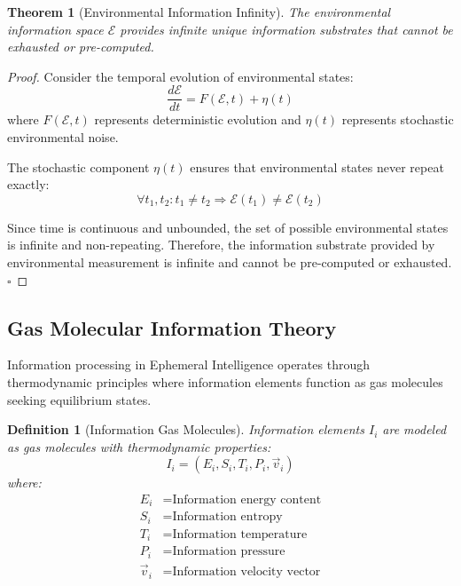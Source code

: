 \documentclass[12pt,a4paper]{article}
\newtheorem{theorem}{Theorem}
\newtheorem{definition}{Definition}
\begin{document}
\begin{theorem}[Environmental Information Infinity]
The environmental information space $\mathcal{E}$ provides infinite unique information substrates that cannot be exhausted or pre-computed.
\end{theorem}

\begin{proof}
Consider the temporal evolution of environmental states:
\begin{equation}
\frac{d\mathcal{E}}{dt} = F(\mathcal{E}, t) + \eta(t)
\end{equation}
where $F(\mathcal{E}, t)$ represents deterministic evolution and $\eta(t)$ represents stochastic environmental noise.

The stochastic component $\eta(t)$ ensures that environmental states never repeat exactly:
\begin{equation}
\forall t_1, t_2 : t_1 \neq t_2 \Rightarrow \mathcal{E}(t_1) \neq \mathcal{E}(t_2)
\end{equation}

Since time is continuous and unbounded, the set of possible environmental states is infinite and non-repeating. Therefore, the information substrate provided by environmental measurement is infinite and cannot be pre-computed or exhausted. $\square$
\end{proof}

\subsection{Gas Molecular Information Theory}

Information processing in Ephemeral Intelligence operates through thermodynamic principles where information elements function as gas molecules seeking equilibrium states.

\begin{definition}[Information Gas Molecules]
Information elements $I_i$ are modeled as gas molecules with thermodynamic properties:
\begin{equation}
I_i = (E_i, S_i, T_i, P_i, \vec{v}_i)
\end{equation}
where:
\begin{align}
E_i &= \text{Information energy content} \\
S_i &= \text{Information entropy} \\
T_i &= \text{Information temperature} \\
P_i &= \text{Information pressure} \\
\vec{v}_i &= \text{Information velocity vector}
\end{align}
\end{definition}
\end{document}
